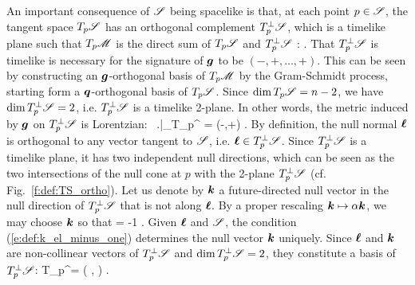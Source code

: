 An important consequence of $\mathscr{S}$ being spacelike is that, at each point
$p\in \mathscr{S}$, the tangent space $T_p\mathscr{S}$ has an orthogonal complement
$T_p^\perp\mathscr{S}$,  which is a timelike plane such that
$T_p\mathscr{M}$ is the direct sum of $T_p\mathscr{S}$ and $T_p^\perp\mathscr{S}$ :
\be \label{e:def:TM_direct_sum}
   .
\ee
That $T_p^\perp\mathscr{S}$ is timelike is necessary for the signature of $\bm{g}$
to be $(-,+,\ldots,+)$. This can be seen by constructing an $\bm{g}$-orthogonal
basis of $T_p\mathscr{M}$ by the Gram-Schmidt process, starting form a
$\bm{q}$-orthogonal basis of $T_p\mathscr{S}$. Since $\dim T_p\mathscr{S} = n-2$, we have
$\dim T_p^\perp\mathscr{S} = 2$, i.e. $T_p^\perp\mathscr{S}$ is a timelike 2-plane.
In other words, the metric induced by $\bm{g}$ on
$T_p^\perp\mathscr{S}$ is Lorentzian:
\be
    \, \left.\right|_{T_p^\perp\Sp} = (-,+) .
\ee
By definition, the null normal $\bm{\ell}$ is orthogonal to any vector
tangent to $\mathscr{S}$, i.e. $\bm{\ell} \in T_p^\perp\mathscr{S}$.
Since $T_p^\perp\mathscr{S}$ is a timelike plane, it has two independent null directions,
which can be seen as the two intersections of the null cone at $p$ with
the 2-plane $T_p^\perp\mathscr{S}$ (cf. Fig.~\ref{f:def:TS_ortho}).
Let us denote by $\bm{k}$ a future-directed null vector in the null direction of $T_p^\perp\mathscr{S}$
that is not along $\bm{\ell}$. By a proper rescaling $\bm{k}\mapsto \alpha\bm{k}$,
we may choose $\bm{k}$ so that
\be \label{e:def:k_el_minus_one}
        \cdot\wl = -1 .
\ee
Given $\bm{\ell}$ and $\mathscr{S}$, the condition (\ref{e:def:k_el_minus_one})
determines the null vector $\bm{k}$ uniquely.
Since $\bm{\ell}$ and $\bm{k}$ are non-collinear vectors of $T_p^\perp\mathscr{S}$ and
$\dim T_p^\perp\mathscr{S} = 2$, they constitute a basis of $T_p^\perp\mathscr{S}$:
\be \label{e:def:TSperp_Span_k_l}
    T_p^\perp\Sp = \left( \wl,  \right) .
\ee


